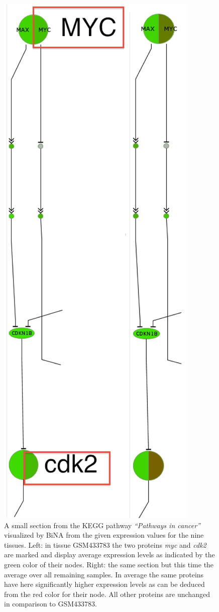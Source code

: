 \begin{figure}[Htbp]
 \centering
 \includegraphics[scale=0.3]{./img/pinc.png}
 \caption{A small section from the KEGG pathway \textit{``Pathways in cancer''}
visualized by BiNA from the given expression values for the nine tissues. Left:
in tissue GSM433783 the two proteins \textit{myc} and \textit{cdk2} are marked
and display average expression levels as indicated by the green color of their
nodes. Right: the same section but this time the average over all remaining
samples. In average the same proteins have here significantly higher expression
levels as can be deduced from the red color for their node. All other proteins
are unchanged in comparison to GSM433783.}
 \label{fig:pathwaysincancer}
\end{figure}


